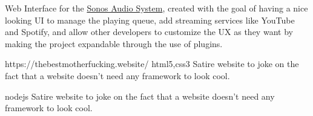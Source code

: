 \begin{CV}
    

    {Web Interface for the \href{https://sonos.com/}{Sonos Audio System}, created with the goal of having a
    nice looking UI to manage the playing queue, add streaming services like YouTube and Spotify, and allow
    other developers to customize the UX as they want by making the project expandable through the use of plugins.}
    
    {https://thebestmotherfucking.website/}
    {html5,css3}
    {Satire website to joke on the fact that a website doesn't need any framework to look cool.}
    
    {nodejs}
    {Satire website to joke on the fact that a website doesn't need any framework to look cool.}


    
    
\end{CV}
